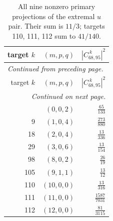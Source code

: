 \begingroup\small
\setlength{\tabcolsep}{5pt}
\begin{longtable}{rrr}
\caption{All nine nonzero primary projections of the extremal $u$ pair. Their sum is $11/3$; targets 110, 111, 112 sum to $41/140$.}\label{expphysics:u-pair}\\
\toprule
target $k$ & $(m,p,q)$ & $|C_{68,95}^{\ k}|^2$\\
\midrule
\endfirsthead
\multicolumn{3}{l}{\small\itshape Continued from preceding page.}\\
\toprule
target $k$ & $(m,p,q)$ & $|C_{68,95}^{\ k}|^2$\\
\midrule
\endhead
\midrule
\multicolumn{3}{r}{\small\itshape Continued on next page.}\\
\endfoot
\bottomrule
\endlastfoot
2 & $(0,0,2)$ & $\frac{65}{133}$\\
9 & $(1,0,4)$ & $\frac{273}{880}$\\
18 & $(2,0,4)$ & $\frac{13}{336}$\\
29 & $(3,0,6)$ & $\frac{13}{154}$\\
98 & $(8,0,2)$ & $\frac{26}{19}$\\
105 & $(9,1,1)$ & $\frac{13}{12}$\\
110 & $(10,0,0)$ & $\frac{13}{316}$\\
111 & $(11,0,0)$ & $\frac{1587}{7031}$\\
112 & $(12,0,0)$ & $\frac{81}{3115}$\\
\end{longtable}
\endgroup
